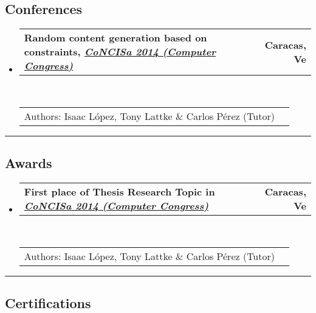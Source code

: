 \documentclass[10pt,letterpaper]{article}
\makeatletter
\newcommand{\headerrow}[2]
{\begin{tabular*}{\linewidth}{l@{\extracolsep{\fill}}r}
	#1 &
	#2 \\
\end{tabular*}}
\makeatother
\begin{document}
\subsection*{Conferences}

\begin{itemize}
  \parskip=0.1em
\item 
   \headerrow
   {\textbf{Random content generation based on constraints, \emph{\href{http://www.concisa.net.ve/2014/}{CoNCISa 2014 (Computer Congress)}}}}
   {\textbf{Caracas, Ve}}
  \\
  \headerrow
   {Authors: Isaac López, Tony Lattke \& Carlos Pérez (Tutor)}{}
\end{itemize}

\newpage
\hrule
\vspace{-0.4em}
\subsection*{Awards}

\begin{itemize}
  \parskip=0.1em
\item 
   \headerrow
   {\textbf{First place of Thesis Research Topic in \emph{\href{http://www.concisa.net.ve/2014/}{CoNCISa 2014 (Computer Congress)}}}}
   {\textbf{Caracas, Ve}}
  \\
  \headerrow
   {Authors: Isaac López, Tony Lattke \& Carlos Pérez (Tutor)}{}
\end{itemize}

\hrule
\vspace{-0.4em}
\subsection*{Certifications}
\end{document}
